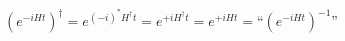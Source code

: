 \begin{equation}
\left( e^{-iHt}\right)^\dagger = e^{(-i)^\ast H^\dagger t} =
	e^{+iH^\dagger t } = e^{+iHt}
	= \textrm{``}\left( e^{-iHt}\right)^{-1}\textrm{''}
\label{eq:trad}
\end{equation}

